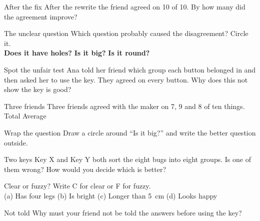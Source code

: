\begin{puzzle}{After the fix}
After the rewrite the friend agreed on 10 of 10. By how many did the agreement improve? \wline[1.6cm]
\end{puzzle}

\begin{puzzle}{The unclear question}
Which question probably caused the disagreement? Circle it.\\
\textbf{Does it have holes?} \qquad \textbf{Is it big?} \qquad \textbf{Is it round?}
\end{puzzle}

\begin{puzzle}{Spot the unfair test}
Ana told her friend which group each button belonged in and then asked her to use the key. They agreed on every button. Why does this not show the key is good? \wline[6cm]
\end{puzzle}

\begin{puzzle}{Three friends}
Three friends agreed with the maker on 7, 9 and 8 of ten things. Total \wline[1.6cm] Average \wline[1.6cm]
\end{puzzle}

\clearpage

\begin{puzzle}{Wrap the question}
Draw a circle around ``Is it big?'' and write the better question outside.
\begin{center}\end{center}
\end{puzzle}

\begin{puzzle}{Two keys}
Key X and Key Y both sort the eight bugs into eight groups. Is one of them wrong? \wline[2cm] How would you decide which is better? \wline[4cm]
\end{puzzle}

\begin{puzzle}{Clear or fuzzy?}
Write C for clear or F for fuzzy.\\
(a) Has four legs \wline[1cm] \quad (b) Is bright \wline[1cm] \quad (c) Longer than 5~cm \wline[1cm] \quad (d) Looks happy \wline[1cm]
\end{puzzle}

\begin{puzzle}{Not told}
Why must your friend not be told the answers before using the key? \wline[6cm]
\end{puzzle}

